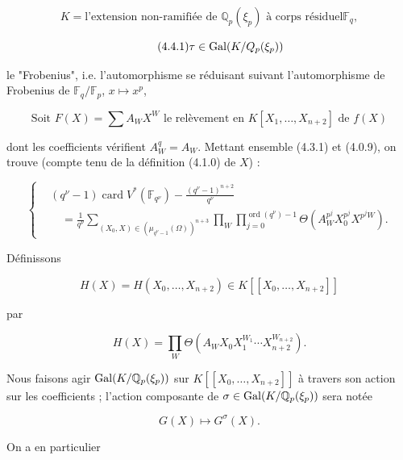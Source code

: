 \begin{equation}\tag{4.4.0}
K=\text{l'extension non-ramifiée de $\mathbb Q_p(\xi_p)$ à corps résiduel
$\mathbb F_q$},
\end{equation}

\begin{equation}\tag{4.4.1}
\tau\in\operatorname{Gal}(K/Q_p(\xi_p))
\end{equation}

le "Frobenius", i.e. l'automorphisme se réduisant suivant l'automorphisme
de Frobenius de $\mathbb F_q/\mathbb F_p$, $x\longmapsto x^p$,

\begin{equation}\tag{4.4.2}
\text{Soit }F(X)=\sum A_WX^W
\text{ le relèvement en $K[X_1,\ldots,X_{n+2}]$ de $f(X)$}
\end{equation}

dont les coefficients vérifient $A_W^q=A_W$. Mettant ensemble (4.3.1) et
(4.0.9), on trouve (compte tenu de la définition (4.1.0) de $X$) :

\begin{equation}\tag{4.4.3}
\left\{
\begin{aligned}
&(q^\nu-1)\operatorname{card}V^*(\mathbb F_{q^\nu})
-\frac{(q^\nu-1)^{n+2}}{q^\nu}\\
&\quad=\frac1{q^\nu}
\sum_{(X_0,X)\in(\mu_{q^\nu-1}(\Omega))^{n+3}}
\prod_W\prod_{j=0}^{\operatorname{ord}(q^\nu)-1}
\Theta\!\left(A_W^{p^j}X_0^{p^j}X^{p^jW}\right).
\end{aligned}
\right.
\end{equation}

Définissons

\[
H(X)=H(X_0,\ldots,X_{n+2})\in K[[X_0,\ldots,X_{n+2}]]
\]

par

\begin{equation}\tag{4.4.4}
H(X)=\prod_W
\Theta\!\left(A_WX_0X_1^{W_1}\cdots X_{n+2}^{W_{n+2}}\right).
\end{equation}

Nous faisons agir $\operatorname{Gal}(K/\mathbb Q_p(\xi_p))$ sur
$K[[X_0,\ldots,X_{n+2}]]$ à travers son action sur les coefficients ;
l'action composante de $\sigma\in\operatorname{Gal}(K/\mathbb Q_p(\xi_p))$ sera notée

\begin{equation}\tag{4.4.5}
G(X)\longmapsto G^\sigma(X).
\end{equation}


On a en particulier


